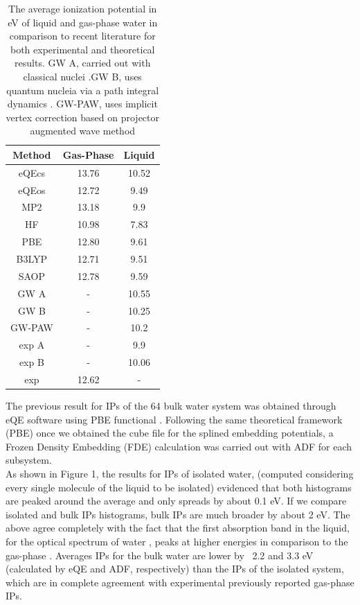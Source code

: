 \documentclass[12pt,a4paper]{article}
\begin{document}
\begin{table}[!ht]
\begin{center}
\setlength{\tabcolsep}{18pt}
  \caption{The average ionization potential in eV of liquid and gas-phase water in comparison to recent literature for both experimental and theoretical results. GW A, carried out with classical nuclei \cite{gaiduk2018electron}.GW B, uses quantum nucleia via a path integral dynamics \cite{gaiduk2018electron}. GW-PAW, uses implicit vertex correction based on projector augmented wave method\cite{ziaei2018probing}}
  \label{tab:table1}
  \begin{tabular}{ ccc }
  \hline
          Method &Gas-Phase& Liquid \\
  	\hline
          eQEcs&13.76&10.52\\
          eQEos&12.72&9.49\\
          MP2&13.18&9.9\\
          HF&10.98& 7.83\\
          PBE&12.80&9.61\\
          B3LYP&12.71&9.51\\
          SAOP&12.78&9.59\\
          GW A \cite{gaiduk2018electron} &- &10.55\\
          GW B\cite{gaiduk2018electron} &- &10.25\\
          GW-PAW\cite{ziaei2018probing} &- &10.2 \\
          exp A \cite{winter2004full} &- &9.9 \\
          exp B \cite{delahay1981chem} &- &10.06 \\
          exp \cite{nist2015nist} &12.62 &- \\
  	\hline
  	\end{tabular}
 \end{center}
\end{table}

The previous result for IPs of the 64 bulk water system was obtained through eQE software using PBE functional \cite{tolle2019charged}. 
Following the same theoretical framework (PBE) once we obtained the cube file for the splined embedding potentials, a Frozen Density 
Embedding (FDE) calculation was carried out with ADF for each subsystem. \\

As shown in Figure 1, the results for IPs of isolated water, (computed considering every single
molecule of the liquid to be isolated) evidenced that both histograms are peaked around the average
and only spreads by about 0.1 eV. If we compare isolated and bulk IPs histograms,
bulk IPs are much broader by about 2 eV. The above agree completely with the fact that the first
absorption band in the liquid, for the optical spectrum of water \cite{blase2016erratum,genova2017cooperation,hermann2008resolving,hahn2005optical},
peaks at higher energies in comparison to the gas-phase \cite{tolle2019charged}. Averages IPs for the bulk water are lower by ~2.2 and 3.3 eV
(calculated by eQE and ADF, respectively) than the IPs of the isolated system, which are in complete agreement
with experimental previously reported \cite{nist2015nist} gas-phase IPs. \\
\end{document}

